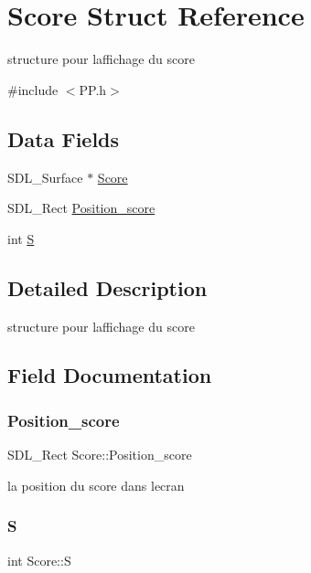 \hypertarget{structScore}{}\section{Score Struct Reference}
\label{structScore}


structure pour l\textquotesingle{}affichage du score  




{\ttfamily \#include $<$P\+P.\+h$>$}

\subsection*{Data Fields}
\begin{DoxyCompactItemize}
\item 
S\+D\+L\+\_\+\+Surface $\ast$ \hyperlink{structScore_aa1e07a19fbd1cb60bd7358b64ffac283}{Score}
\item 
S\+D\+L\+\_\+\+Rect \hyperlink{structScore_a8402710c14fc3b01a15b4c324844705e}{Position\+\_\+score}
\item 
int \hyperlink{structScore_a34dd585c0a3fd0b39ac754e072ee1476}{S}
\end{DoxyCompactItemize}


\subsection{Detailed Description}
structure pour l\textquotesingle{}affichage du score 

\subsection{Field Documentation}
\mbox{\label{structScore_a8402710c14fc3b01a15b4c324844705e}} 
\subsubsection{\texorpdfstring{Position\+\_\+score}{Position\_score}}
{\footnotesize\ttfamily S\+D\+L\+\_\+\+Rect Score\+::\+Position\+\_\+score}

la position du score dans l\textquotesingle{}ecran \mbox{\label{structScore_a34dd585c0a3fd0b39ac754e072ee1476}} 
\subsubsection{\texorpdfstring{S}{S}}
{\footnotesize\ttfamily int Score\+::S}

